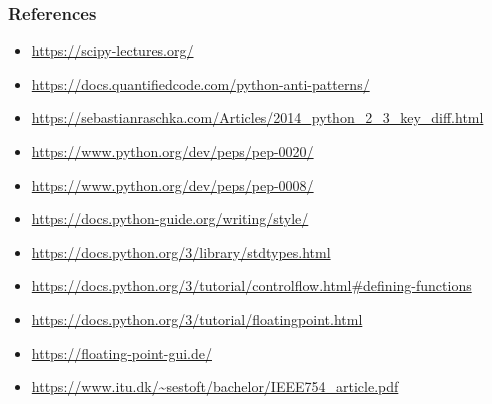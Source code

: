 \documentclass[9pt]{beamer}
\begin{document}
\begin{frame}
  \frametitle{References}
  \scriptsize
  \begin{itemize}
  \item\url{https://scipy-lectures.org/}
  \item\url{https://docs.quantifiedcode.com/python-anti-patterns/}
  \item\url{https://sebastianraschka.com/Articles/2014_python_2_3_key_diff.html}
  \item\url{https://www.python.org/dev/peps/pep-0020/}
  \item\url{https://www.python.org/dev/peps/pep-0008/}
  \item\url{https://docs.python-guide.org/writing/style/}
  \item\url{https://docs.python.org/3/library/stdtypes.html}
  \item\url{https://docs.python.org/3/tutorial/controlflow.html\#defining-functions}
  \item\url{https://docs.python.org/3/tutorial/floatingpoint.html}
  \item\url{https://floating-point-gui.de/}
  \item\url{https://www.itu.dk/~sestoft/bachelor/IEEE754_article.pdf}
  \end{itemize}
\end{frame}
\end{document}
